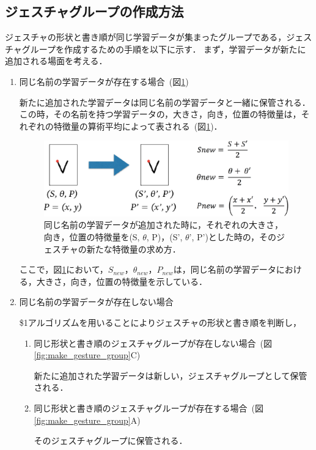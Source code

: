 \subsection{ジェスチャグループの作成方法}
ジェスチャの形状と書き順が同じ学習データが集まったグループである，ジェスチャグループを作成するための手順を以下に示す．
まず，学習データが新たに追加される場面を考える．
\begin{enumerate}
\renewcommand{\labelenumi}{\Alph{enumi}.}
\item 同じ名前の学習データが存在する場合~(図\ref{fig:same_gesture})

新たに追加された学習データは同じ名前の学習データと一緒に保管される．この時，その名前を持つ学習データの，大きさ，向き，位置の特徴量は，それぞれの特徴量の算術平均によって表される~(図\ref{fig:same_gesture})．

\begin{figure} [h!]
	\begin{center}
		\includegraphics [width=0.9\hsize ]{img/same_gesture.eps}
	\end{center}
	\caption{同じ名前の学習データが追加された時に，それぞれの大きさ，向き，位置の特徴量を(S, $\theta$, P)，(S', $\theta$', P')とした時の，そのジェスチャの新たな特徴量の求め方．}
	\label{fig:same_gesture}
\end{figure}

ここで，図\ref{fig:same_gesture}において，$S_\textit{new}$，$\theta_\textit{new}$，$P_\textit{new}$は，同じ名前の学習データにおける，大きさ，向き，位置の特徴量を示している．

 
\item 同じ名前の学習データが存在しない場合

\$1アルゴリズムを用いることによりジェスチャの形状と書き順を判断し，

\begin{enumerate}
\renewcommand{\labelenumi}{\alph{enumi}.}

\item 同じ形状と書き順のジェスチャグループが存在しない場合~(図\ref{fig:make_gesture_group}C)
 
新たに追加された学習データは新しい，ジェスチャグループとして保管される．
   
\item 同じ形状と書き順のジェスチャグループが存在する場合~(図\ref{fig:make_gesture_group}A)

そのジェスチャグループに保管される．

\end{enumerate}
\end{enumerate}

